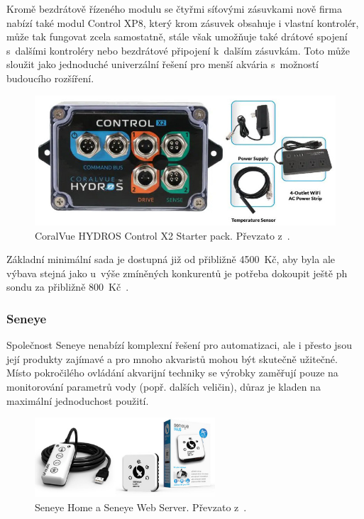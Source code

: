             Kromě bezdrátově řízeného modulu se čtyřmi síťovými zásuvkami nově firma nabízí také modul Control XP8, který krom zásuvek obsahuje i vlastní kontrolér, může tak fungovat zcela samostatně, stále však umožňuje také drátové spojení s~dalšími kontroléry nebo bezdrátové připojení k~dalším zásuvkám. Toto může sloužit jako jednoduché univerzální řešení pro menší akvária s~možností budoucího rozšíření. 

            \begin{figure}[h!]
                \centering
                \includegraphics[width=\textwidth]{obrazky/trh/hydros-x2-starter-pack.jpg}
                \caption{CoralVue HYDROS Control X2 Starter pack. Převzato z~\cite{eshop-coralvue-hydros}.}
                \label{fig:obrazky-trh-hydros-x2-starter-pack-jpg}
            \end{figure}
            
            Základní minimální sada je dostupná již od přibližně \qty{4500}{Kč}, aby byla ale výbava stejná jako u~výše zmíněných konkurentů je potřeba dokoupit ještě \acs{ph} sondu za přibližně \qty{800}{Kč}~\cite{coralvuehydros,eshop-coralvue-hydros}.
            
        \subsubsection{Seneye}
            Společnost Seneye nenabízí komplexní řešení pro automatizaci, ale i přesto jsou její produkty zajímavé a pro mnoho akvaristů mohou být skutečně užitečné. Místo pokročilého ovládání akvarijní techniky se výrobky zaměřují pouze na monitorování parametrů vody (popř. dalších veličin), důraz je kladen na maximální jednoduchost použití. 
            
            \begin{figure}[h!]
                \centering
                \includegraphics[width=0.6\textwidth]{obrazky/trh/seneye-home.jpg}
                \caption{Seneye Home a Seneye Web Server. Převzato z~\cite{seneye-home}.}
                \label{fig:obrazky-trh-seneye-home-jpg}
            \end{figure}

